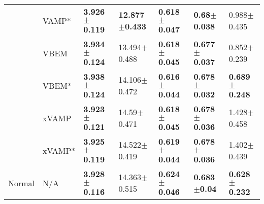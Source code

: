 \begin{tabular}{lllllll}
       & VAMP* &  \textbf{3.926$\pm$0.119} &  \textbf{12.877$\pm$0.433} &  \textbf{0.618$\pm$0.047} &   \textbf{0.68$\pm$0.038} &           0.988$\pm$0.435 \\
       & VBEM &  \textbf{3.934$\pm$0.124} &           13.494$\pm$0.488 &  \textbf{0.618$\pm$0.045} &  \textbf{0.677$\pm$0.037} &           0.852$\pm$0.239 \\
       & VBEM* &  \textbf{3.938$\pm$0.124} &           14.106$\pm$0.472 &  \textbf{0.616$\pm$0.044} &  \textbf{0.678$\pm$0.032} &  \textbf{0.689$\pm$0.248} \\
       & xVAMP &  \textbf{3.923$\pm$0.121} &            14.59$\pm$0.471 &  \textbf{0.618$\pm$0.045} &  \textbf{0.678$\pm$0.036} &           1.428$\pm$0.458 \\
       & xVAMP* &  \textbf{3.925$\pm$0.119} &           14.522$\pm$0.419 &  \textbf{0.619$\pm$0.044} &  \textbf{0.678$\pm$0.036} &           1.402$\pm$0.439 \\
Normal & N/A &  \textbf{3.928$\pm$0.116} &           14.363$\pm$0.515 &  \textbf{0.624$\pm$0.046} &   \textbf{0.683$\pm$0.04} &  \textbf{0.628$\pm$0.232} \\
\bottomrule
\end{tabular}

